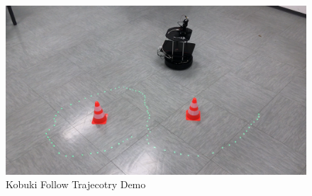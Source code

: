 \begin{figure}
	\centering
	\includegraphics[width=\textwidth]{img/followTrajectoryDemo.png}%
	\caption{Kobuki Follow Trajecotry Demo}
	\label{fig:followTrajectoryDemo}
\end{figure}
